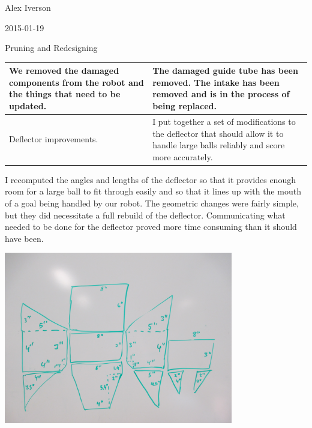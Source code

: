 Alex Iverson

2015-01-19

Pruning and Redesigning

\begin{tabular}{|p{5cm}|p{5cm}|}
 \hline
 We removed the damaged components from the robot and the things that need to be updated. &
 The damaged guide tube has been removed. The intake has been removed and is in the process of being replaced.
 \\
 \hline
 Deflector improvements. &
 I put together a set of modifications to the deflector that should allow it to handle large balls reliably and score more accurately.
 \\
 \hline
\end{tabular}

I recomputed the angles and lengths of the deflector so that it provides enough room for a large ball to fit through easily and so that it lines up with the mouth of a goal being handled by our robot.
The geometric changes were fairly simple, but they did necessitate a full rebuild of the deflector. Communicating what needed to be done for the deflector proved more time consuming than it should have been.
\begin{center}
 \includegraphics[width=10cm]{./Entries/Images/deflectorDiagramFinal.JPG}
\end{center}
